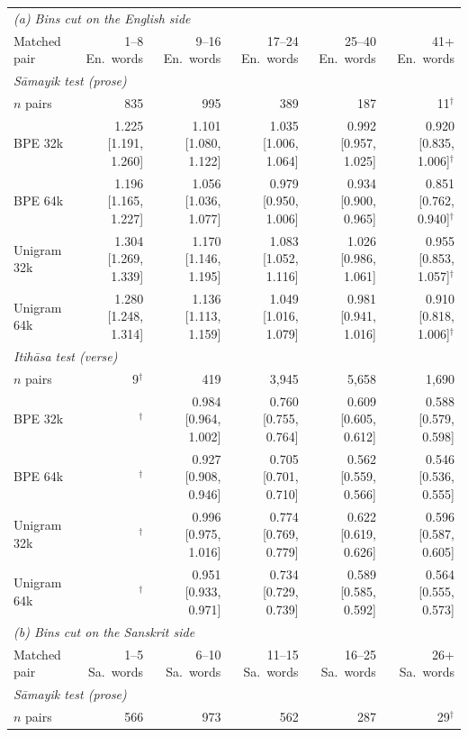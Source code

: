 \begin{table}[t]
\centering
\setlength{\tabcolsep}{3.5pt}
\scriptsize
\begin{tabular}{lrrrrr}
\toprule
\multicolumn{6}{l}{\emph{(a) Bins cut on the English side}} \\
Matched pair & 1--8 En.\ words & 9--16 En.\ words & 17--24 En.\ words & 25--40 En.\ words & 41+ En.\ words \\
\midrule
\multicolumn{6}{l}{\emph{S\=amayik test (prose)}} \\
$n$ pairs & 835 & 995 & 389 & 187 & 11$^{\dagger}$ \\
BPE 32k & 1.225 [1.191, 1.260] & 1.101 [1.080, 1.122] & 1.035 [1.006, 1.064] & 0.992 [0.957, 1.025] & 0.920 [0.835, 1.006]$^{\dagger}$ \\
BPE 64k & 1.196 [1.165, 1.227] & 1.056 [1.036, 1.077] & 0.979 [0.950, 1.006] & 0.934 [0.900, 0.965] & 0.851 [0.762, 0.940]$^{\dagger}$ \\
Unigram 32k & 1.304 [1.269, 1.339] & 1.170 [1.146, 1.195] & 1.083 [1.052, 1.116] & 1.026 [0.986, 1.061] & 0.955 [0.853, 1.057]$^{\dagger}$ \\
Unigram 64k & 1.280 [1.248, 1.314] & 1.136 [1.113, 1.159] & 1.049 [1.016, 1.079] & 0.981 [0.941, 1.016] & 0.910 [0.818, 1.006]$^{\dagger}$ \\
\midrule
\multicolumn{6}{l}{\emph{Itih\=asa test (verse)}} \\
$n$ pairs & 9$^{\dagger}$ & 419 & 3,945 & 5,658 & 1,690 \\
BPE 32k & $^{\dagger}$ & 0.984 [0.964, 1.002] & 0.760 [0.755, 0.764] & 0.609 [0.605, 0.612] & 0.588 [0.579, 0.598] \\
BPE 64k & $^{\dagger}$ & 0.927 [0.908, 0.946] & 0.705 [0.701, 0.710] & 0.562 [0.559, 0.566] & 0.546 [0.536, 0.555] \\
Unigram 32k & $^{\dagger}$ & 0.996 [0.975, 1.016] & 0.774 [0.769, 0.779] & 0.622 [0.619, 0.626] & 0.596 [0.587, 0.605] \\
Unigram 64k & $^{\dagger}$ & 0.951 [0.933, 0.971] & 0.734 [0.729, 0.739] & 0.589 [0.585, 0.592] & 0.564 [0.555, 0.573] \\
\midrule
\multicolumn{6}{l}{\emph{(b) Bins cut on the Sanskrit side}} \\
Matched pair & 1--5 Sa.\ words & 6--10 Sa.\ words & 11--15 Sa.\ words & 16--25 Sa.\ words & 26+ Sa.\ words \\
\midrule
\multicolumn{6}{l}{\emph{S\=amayik test (prose)}} \\
$n$ pairs & 566 & 973 & 562 & 287 & 29$^{\dagger}$ \\

\end{tabular}
\end{table}
